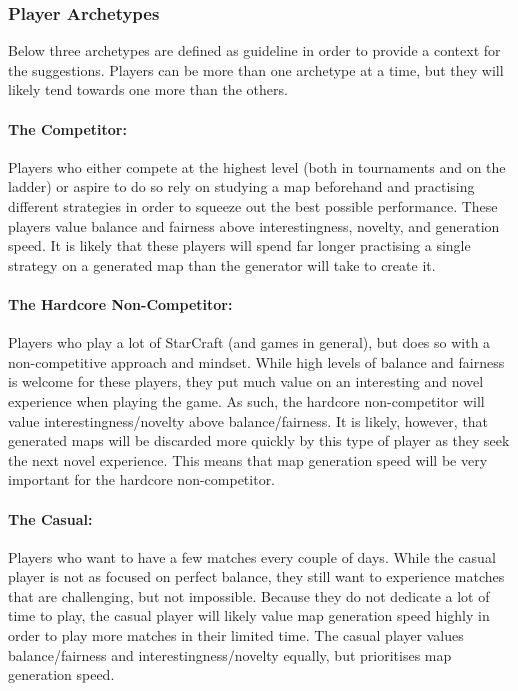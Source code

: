 \subsubsection{Player Archetypes}
Below three archetypes are defined as guideline in order to provide a context for the suggestions. Players can be more than one archetype at a time, but they will likely tend towards one more than the others.

\paragraph{The Competitor:} Players who either compete at the highest level (both in tournaments and on the ladder) or aspire to do so rely on studying a map beforehand and practising different strategies in order to squeeze out the best possible performance. These players value balance and fairness above interestingness, novelty, and generation speed. It is likely that these players will spend far longer practising a single strategy on a generated map than the generator will take to create it.

\paragraph{The Hardcore Non-Competitor:} Players who play a lot of StarCraft (and games in general), but does so with a non-competitive approach and mindset. While high levels of balance and fairness is welcome for these players, they put much value on an interesting and novel experience when playing the game. As such, the hardcore non-competitor will value interestingness/novelty above balance/fairness. It is likely, however, that generated maps will be discarded more quickly by this type of player as they seek the next novel experience. This means that map generation speed will be very important for the hardcore non-competitor.

\paragraph{The Casual:} Players who want to have a few matches every couple of days. While the casual player is not as focused on perfect balance, they still want to experience matches that are challenging, but not impossible. Because they do not dedicate a lot of time to play, the casual player will likely value map generation speed highly in order to play more matches in their limited time. The casual player values balance/fairness and interestingness/novelty equally, but prioritises map generation speed.

